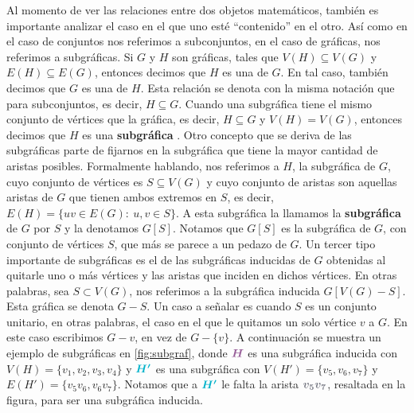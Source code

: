 Al momento de ver las relaciones entre dos objetos matem\'aticos, tambi\'en es
importante analizar el caso en el que uno est\'e ``contenido'' en el otro. As\'i
como en el caso de conjuntos nos referimos a subconjuntos, en el caso de
gr\'aficas, nos referimos a subgr\'aficas. Si $G$ y $H$ son gr\'aficas, tales
que $V(H) \subseteq V(G)$ y $E(H) \subseteq E(G)$, entonces decimos que $H$ es
una  de $G$. En tal caso, tambi\'en decimos que $G$ es una
 de $H$. Esta relaci\'on se denota con la misma
notaci\'on que para subconjuntos, es decir, $H \subseteq G$. Cuando una
subgr\'afica tiene el mismo conjunto de v\'ertices que la gr\'afica, es decir,
$H \subseteq G$ y $V(H)= V(G)$, entonces decimos que $H$ es una
\textbf{subgr\'afica} . Otro concepto que se
deriva de las subgr\'aficas parte de fijarnos en la subgr\'afica que tiene la
mayor cantidad de aristas posibles. Formalmente hablando, nos referimos a $H$,
la subgr\'afica de $G$, cuyo conjunto de v\'ertices es $S \subseteq V(G)$ y cuyo
conjunto de aristas son aquellas aristas de $G$ que tienen ambos extremos en
$S$, es decir, $E(H) = \{uv \in E(G) \colon\ u,v \in S\}$. A esta subgr\'afica
la llamamos la \textbf{subgr\'afica}  de $G$
por $S$ y la denotamos $G[S]$. Notamos que $G[S]$ es la subgr\'afica de $G$, con
conjunto de v\'ertices $S$, que m\'as se parece a un pedazo de $G$. Un tercer
tipo importante de subgr\'aficas es el de las subgr\'aficas inducidas de $G$
obtenidas al quitarle uno o m\'as v\'ertices y las aristas que inciden en dichos
v\'ertices. En otras palabras, sea $S \subset V(G)$, nos referimos a la
subgr\'afica inducida $G[V(G)-S]$. Esta gr\'afica se denota $G-S$. Un caso a
se\~{n}alar es cuando $S$ es un conjunto unitario, en otras palabras, el caso en
el que le quitamos un solo v\'ertice $v$ a $G$. En este caso escribimos $G-v$,
en vez de $G-\{v\}$. A continuaci\'on se muestra un ejemplo de subgr\'aficas en
\cref{fig:subgraf}, donde ${\color{morado}\boldsymbol {H}}$ es una subgr\'afica
inducida con $V(H) = \{v_1,v_2,v_3,v_4\}$ y ${\color{azulCielo}{\boldsymbol{
H'}}}$ es una subgr\'afica con $V(H')=\{v_5,v_6,v_7\}$ y $E(H')=\{v_5v_6,
v_6v_7\}$. Notamos que a ${\color{azulCielo}\boldsymbol {H'}}$ le falta la
arista ${\color{grisOscuro!80}\boldsymbol {v_5v_7}}$, resaltada en la figura,
para ser una subgr\'afica inducida. 

